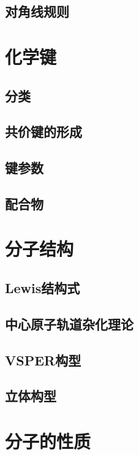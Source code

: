\documentclass[a4paper]{article}
\begin{document}
	\subsection{对角线规则}
	
	
	\clearpage
	\section{化学键}
	
	
	\subsection{分类}
	
	
	\subsection{共价键的形成}
	
	
	\subsection{键参数}
	
	
	\subsection{配合物}
	
	
	\clearpage
	\section{分子结构}
	
	
	\subsection{Lewis结构式}
	
	
	\subsection{中心原子轨道杂化理论}
	
	
	\subsection{VSPER构型}
	
	
	\subsection{立体构型}
	
	
	\clearpage
	\section{分子的性质}
	
\end{document}

